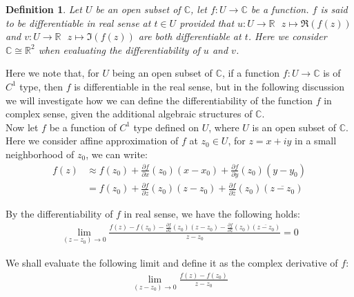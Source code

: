 \documentclass[15pt]{book}
\theoremstyle{break}
\theoremstyle{break}
\newtheorem{defn}{Definition}[corL]
\newcommand{\R}{\mathbb{R}}
\newcommand{\Complex}{\mathbb{C}}
\newcommand{\pd}{\partial}
\begin{document}
\hfill\break
\begin{defn}
Let $U$ be an open subset of $\Complex$, let $f:U \to \Complex$ be a function. $f$ is said to be differentiable in real sense at $t \in U$ provided that $u:U \to \R \ \ \ z\mapsto\Re(f(z))$ and $v:U \to \R \ \ \ z\mapsto\Im(f(z))$ are both differentiable at $t$. Here we consider $\Complex \cong \R^2$ when evaluating the differentiability of $u$ and $v$.  
\end{defn}
\hfill\break
Here we note that, for $U$ being an open subset of $\Complex$, if a function $f:U \to \Complex$ is of $C^1$ type, then $f$ is differentiable in the real sense, but in the following discussion we will investigate how we can define the differentiability of the function $f$ in complex sense, given the additional algebraic structures of $\Complex$.\\

Now let $f$ be a function of $C^1$ type defined on $U$, where $U$ is an open subset of $\Complex$. Here we consider affine approximation of $f$ at $z_0 \in U$, for $z = x+iy$ in a small neighborhood of $z_0$, we can write:
\begin{align*}
f(z) 
&\approx f(z_0) + \frac{\pd f}{\pd x}(z_0)(x-x_0) +\frac{\pd f}{\pd y}(z_0)(y-y_0)\\ 
&= f(z_0) + \frac{\pd f}{\pd z}(z_0)(z-z_0) + \frac{\pd f}{\pd \bar{z}}(z_0)(\overline{z-z_0})
\end{align*}

By the differentiability of $f$ in real sense, we have the following holds:
\begin{align*}
 \lim_{(z-z_0) \to 0}\frac{f(z) - f(z_0) - \frac{\pd f}{\pd z}(z_0)(z-z_0) - \frac{\pd f}{\pd \bar{z}}(z_0)(\overline{z-z_0}) }{z-z_0} = 0
\tag{P}\end{align*}

We shall evaluate the following limit and define it as the complex derivative of $f$:
\begin{align*}
\lim_{(z-z_0)\to 0}\frac{f(z) - f(z_0)}{z-z_0} \tag{L}
\end{align*}
\end{document}
